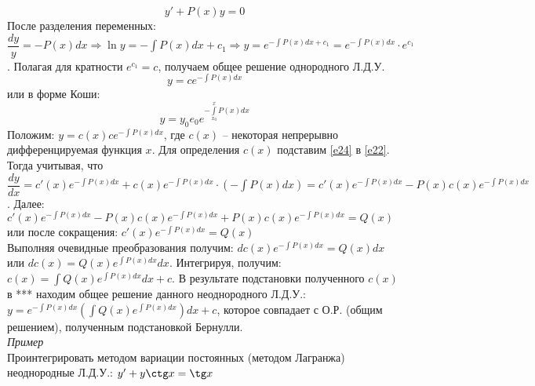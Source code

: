 \documentclass{article}
\numberwithin{equation}{section}
\begin{document}
\begin{equation}\label{e23}
y'+P(x)y=0
\end{equation}
После разделения переменных: $\dfrac{dy}{y}=-P(x)dx\Rightarrow\ln y=-\int P(x)dx+c_1\Rightarrow y=e^{-\int P(x)dx+c_1}=e^{-\int P(x)dx}\cdot e^{c_1}$. Полагая для кратности $e^{c_1}=c$, получаем общее решение однородного Л.Д.У.
\begin{equation}\label{e24}
y=ce^{-\int P(x)dx}
\end{equation}
или в форме Коши:
\begin{equation}\label{e25}
y=y_0e_0e^{-\int\limits_{x_0}^xP(x)dx}
\end{equation}
Положим: $y=c(x)ce^{-\int P(x)dx}$, где $c(x)$ -- некоторая непрерывно дифференцируемая функция $x$. Для определения $c(x)$ подставим \eqref{e24} в \eqref{e22}. Тогда учитывая, что $\dfrac{dy}{dx}=c'(x)e^{-\int P(x)dx}+c(x)e^{-\int P(x)dx}\cdot(-\int P(x)dx)=c'(x)e^{-\int P(x)dx}-P(x)c(x)e^{-\int P(x)dx}$. Далее: $c'(x)e^{-\int P(x)dx}-P(x)c(x)e^{-\int P(x)dx}+P(x)c(x)e^{-\int P(x)dx}=Q(x)$ или после сокращения: $c'(x)e^{-\int P(x)dx}=Q(x)$\\
Выполняя очевидные преобразования получим: $dc(x)e^{-\int P(x)dx}=Q(x)dx$ или $dc(x)=Q(x)e^{\int P(x)dx}dx$. Интегрируя, получим: $c(x)=\int Q(x)e^{\int P(x)dx}dx+c$. В результате подстановки полученного $c(x)$ в \colorbox{red!50}{***} находим общее решение данного неоднородного Л.Д.У.: $y=e^{-\int P(x)dx}(\int Q(x)e^{\int P(x)dx})dx+c$, которое совпадает с О.Р. (общим решением), полученным подстановкой Бернулли.\\
\textit{Пример}\\
Проинтегрировать методом вариации постоянных (методом Лагранжа) неоднородные Л.Д.У.: $y'+y\ctg x=\tg x$
\end{document}
